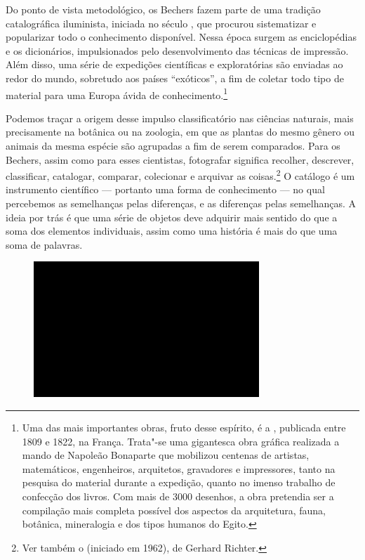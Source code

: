 Do ponto de vista metodológico, os Bechers fazem parte de uma tradição
catalográfica iluminista, iniciada no século , que procurou
sistematizar e popularizar todo o conhecimento disponível. Nessa época
surgem as enciclopédias e os dicionários, impulsionados pelo
desenvolvimento das técnicas de impressão. Além disso, uma série de
expedições científicas e exploratórias são enviadas ao redor do mundo,
sobretudo aos países ``exóticos'', a fim de coletar todo tipo de
material para uma Europa ávida de conhecimento.\footnote{Uma das mais
  importantes obras, fruto desse espírito, é a {}, publicada entre 1809 e 1822, na França. Trata"-se uma
  gigantesca obra gráfica realizada a mando de Napoleão Bonaparte que
  mobilizou centenas de artistas, matemáticos, engenheiros, arquitetos,
  gravadores e impressores, tanto na pesquisa do material durante a
  expedição, quanto no imenso trabalho de confecção dos livros. Com mais
  de 3000 desenhos, a obra pretendia ser a compilação mais completa
  possível dos aspectos da arquitetura, fauna, botânica, mineralogia e
  dos tipos humanos do Egito.}

Podemos traçar a origem desse impulso classificatório nas ciências
naturais, mais precisamente na botânica ou na zoologia, em que as
plantas do mesmo gênero ou animais da mesma espécie são agrupadas a fim
de serem comparados. Para os Bechers, assim como para esses cientistas,
fotografar significa recolher, descrever, classificar, catalogar,
comparar, colecionar e arquivar as coisas.\footnote{Ver também o
  {} (iniciado em 1962), de Gerhard Richter.} O catálogo é um
instrumento científico --- portanto uma forma de conhecimento --- no qual
percebemos as semelhanças pelas diferenças, e as diferenças pelas
semelhanças. A ideia por trás é que uma série de objetos deve adquirir
mais sentido do que a soma dos elementos individuais, assim como uma
história é mais do que uma soma de palavras.

\begin{figure}[!ht]
\centering
 \includegraphics[width=85mm]{./imgs/im1.jpg}
\caption{\tiny{}}
\end{figure}


